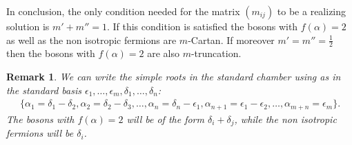 \documentclass[pdftex]{sigma}%
\numberwithin{equation}{section}
\newtheorem{oss}[teo]{Remark} }
\begin{document}
In conclusion, the only condition needed for the matrix $(m_{ij})$ to be a realizing solution is $m' + m'' = 1$. If this condition is satisfied the bosons with $f(\alpha)=2$ as well as the non isotropic fermions are $m$-Cartan. If moreover $m'=m''=\frac{1}{2}$ then the bosons with $f(\alpha)=2$ are also $m$-truncation.

\begin{oss} We can write the simple roots in the standard chamber using as in~\cite{Kac77} the standard basis $\epsilon_1, \dots, \epsilon_{m}, \delta_1, \dots, \delta_{n}$:
\begin{gather*}
 \{ \alpha_1 = \delta_1-\delta_2,  \alpha_2= \delta_2-\delta_3, \dots,  \alpha_{n}= \delta_n-\epsilon_{1},
  \alpha_{n+1}=\epsilon_1-\epsilon_2, \dots, \alpha_{m+n}=\epsilon_m \}.
\end{gather*}
The bosons with $f(\alpha)=2$ will be of the form $\delta_i+\delta_j$, while the non isotropic fermions will be $\delta_i$.
\end{oss}
\end{document}
